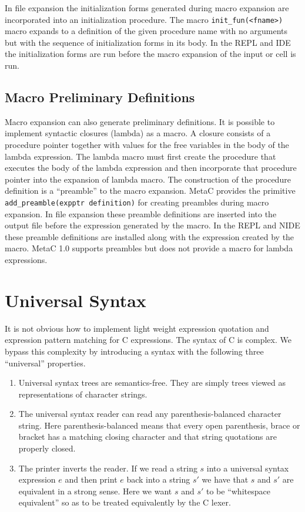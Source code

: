 \documentclass{article}
\begin{document}
In file expansion the initialization forms generated during macro expansion are incorporated into an initialization procedure.
The macro {\tt init\_fun(<fname>)} macro expands to a definition of the given procedure name with no arguments but with the sequence
of initialization forms in its body.  In the REPL and IDE the initialization forms are run before the macro expansion of the input or cell is run.

\subsection{Macro Preliminary Definitions}

Macro expansion can also generate preliminary definitions.  It is possible to implement syntactic closures (lambda) as a macro.
A closure consists of a procedure pointer together with values for the free variables in the body of the lambda expression.  The lambda
macro must first create the procedure that executes the body of the lambda expression and then incorporate that procedure pointer into
the expansion of lambda macro.  The construction of the procedure definition is a ``preamble'' to the macro expansion.
MetaC provides the primitive {\tt add\_preamble(expptr definition)} for creating preambles during macro expansion.
In file expansion these preamble definitions are inserted into the output file before the
expression generated by the macro.  In the REPL and NIDE these preamble definitions are installed along with the expression created by the macro.
MetaC 1.0 supports preambles but does not provide a macro for lambda expressions.

\section{Universal Syntax}

It is not obvious how to implement light weight expression quotation and expression pattern matching for C expressions.  The syntax of C is complex.
We bypass this complexity by introducing a syntax with the following three ``universal'' properties.

\begin{enumerate}
\item Universal syntax trees are semantics-free.  They are simply trees viewed as representations of character strings.

\item The universal syntax reader can read any parenthesis-balanced character string.
  Here parenthesis-balanced means that every open parenthesis, brace or bracket has a matching closing character and that string quotations
  are properly closed.
  
\item The printer inverts the reader. If we read a string $s$ into a universal syntax expression
  $e$ and then print $e$ back into a string $s'$ we have that $s$ and $s'$ are equivalent in a strong sense.  Here we want
  $s$ and $s'$ to be ``whitespace equivalent'' so as to be treated equivalently by the C lexer.
\end{enumerate}
\end{document}
